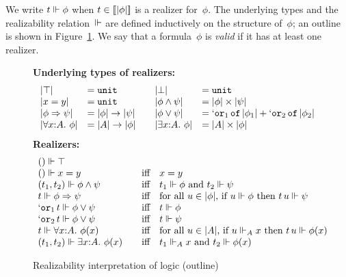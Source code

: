 We write $t \Vdash \phi$ when $t \in [\![|\phi|]\!]$ is a
realizer for~$\phi$. The underlying types and the realizability
relation~$\Vdash$ are defined inductively on the structure of~$\phi$; an
outline is shown in Figure~\ref{fig:rz-logic}. We say that a
formula~$\phi$ is \emph{valid} if it has at least one realizer.
%
\begin{figure}[t]
  \textbf{Underlying types of realizers:}
\[
  \begin{array}{ll@{\qquad}ll}
    \typeOf{\itrue} &= \mathtt{unit} &
    \typeOf{\ifalse} &= \mathtt{unit} \\
    \typeOf{\iequal{x}{y}} &= \mathtt{unit} &
    \typeOf{\iand{\phi}{\psi}} &= \oprod{\typeOf{\phi}}{\typeOf{\psi}} \\
    \typeOf{\iimply{\phi}{\psi}} &= \oarrow{\typeOf{\phi}}{\typeOf{\psi}} &
    \typeOf{\ior{\phi}{\psi}} &=
    \osumtyx{\mathtt{or}_1}{\typeOf{\phi_1}}{\mathtt{or}_2}{\typeOf{\phi_2}} \\
    \typeOf{\iforall{x}{A}{\phi}} &= \oarrow{\typeOf{A}}{\typeOf{\phi}} &
    \typeOf{\iexists{x}{A}{\phi}} &= \oprod{\typeOf{A}}{\typeOf{\phi}}
  \end{array}
\]
  \textbf{Realizers:}
\[
  \begin{array}{ll}
    () \Vdash \top & \\
    () \Vdash x = y
    &\quad\text{iff}\quad 
    x = y
    \\
    (t_1,t_2) \Vdash \phi\land \psi
    &\quad\text{iff}\quad
    \text{$t_1 \Vdash \phi$ and $t_2 \Vdash \psi$}
    \\
    t \Vdash \phi\Rightarrow \psi
    &\quad\text{iff}\quad
    \text{for all $u \in |\phi|$, if $u \Vdash \phi$ then $t\,u
      \Vdash \psi$}
    \\
    `\mathtt{or}_1\,t \Vdash \phi\lor \psi
    &\quad\text{iff}\quad
    \text{$t \Vdash \phi$}
    \\
    `\mathtt{or}_2\,t \Vdash \phi\lor \psi
    &\quad\text{iff}\quad
    \text{$t \Vdash \psi$}
    \\
    t \Vdash \forall x{:}A.\ \phi(x)
    &\quad\text{iff}\quad
    \text{for all $u \in |A|$, if $u \Vdash_A x$ then $t\,u \Vdash \phi(x)$}
    \\
    (t_1, t_2) \Vdash \exists x{:}A.\ \phi(x)
    &\quad\text{iff}\quad
    \text{$t_1 \Vdash_A x$ and $t_2 \Vdash \phi(x)$}
  \end{array}
\]
  \caption{Realizability interpretation of logic (outline)}
  \label{fig:rz-logic}
\end{figure}

